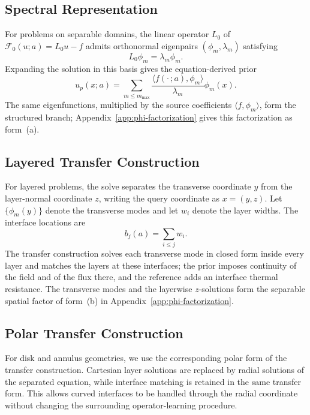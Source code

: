 \documentclass{article}
\begin{document}
\subsection{Spectral Representation}
\label{app:spectral-representation}

For problems on separable domains, the linear operator \(L_0\) of \(\mathcal{F}_0(u;a)=L_0u-f\) admits orthonormal eigenpairs
$(\phi_m,\lambda_m)$ satisfying
\[
L_0\phi_m=\lambda_m\phi_m.
\]
Expanding the solution in this basis gives the equation-derived prior
\begin{equation}
u_p(x;a)
=
\sum_{m\leq m_{\max}}
\frac{
\langle f(\cdot\,;a),\phi_m\rangle
}{
\lambda_m
}
\phi_m(x).
\label{eq:app-spectral-prior}
\end{equation}
The same eigenfunctions, multiplied by the source coefficients $\langle f,\phi_m\rangle$, form the structured branch; Appendix~\ref{app:phi-factorization} gives this factorization as form~(a).

\subsection{Layered Transfer Construction}
\label{app:layered-representation}

For layered problems, the solve separates the transverse coordinate \(y\) from the
layer-normal coordinate \(z\), writing the query coordinate as \(x=(y,z)\). Let \(\{\phi_m(y)\}\) denote the transverse modes and let
$w_i$ denote the layer widths. The interface locations are
\begin{equation}
b_j(a)=\sum_{i\leq j}w_i.
\label{eq:app-interface-location}
\end{equation}
The transfer construction solves each transverse mode in closed form inside every layer and matches the layers at these interfaces; the prior imposes continuity of the field and of the flux there, and the reference adds an interface thermal resistance. The transverse modes and the layerwise $z$-solutions form the separable spatial factor of form~(b) in Appendix~\ref{app:phi-factorization}.

\subsection{Polar Transfer Construction}
\label{app:polar-representation}

For disk and annulus geometries, we use the corresponding polar form of the transfer
construction. Cartesian layer solutions are replaced by radial solutions of the
separated equation, while interface matching is retained in the same transfer
form. This allows curved interfaces to be handled through the radial coordinate
without changing the surrounding operator-learning procedure.
\end{document}
